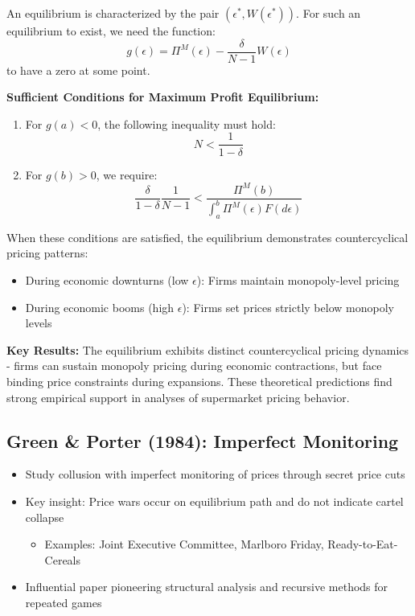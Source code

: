 \documentclass[11pt]{elegantbook_2}
\begin{document}
An equilibrium is characterized by the pair $(\epsilon^*, W(\epsilon^*))$. For such an equilibrium to exist, we need the function:
\[g(\epsilon) = \Pi^M(\epsilon) - \frac{\delta}{N-1}W(\epsilon)\]
to have a zero at some point.

\textbf{Sufficient Conditions for Maximum Profit Equilibrium:}
\begin{enumerate}
    \item For $g(a) < 0$, the following inequality must hold:
    \[N < \frac{1}{1-\delta}\]
    
    \item For $g(b) > 0$, we require:
    \[\frac{\delta}{1-\delta}\frac{1}{N-1} < \frac{\Pi^M(b)}{\int_a^b \Pi^M(\epsilon)F(d\epsilon)}\]
\end{enumerate}

When these conditions are satisfied, the equilibrium demonstrates countercyclical pricing patterns:
\begin{itemize}
    \item During economic downturns (low $\epsilon$): Firms maintain monopoly-level pricing
    \item During economic booms (high $\epsilon$): Firms set prices strictly below monopoly levels
\end{itemize}


\textbf{Key Results:}
The equilibrium exhibits distinct countercyclical pricing dynamics - firms can sustain monopoly pricing during economic contractions, but face binding price constraints during expansions. These theoretical predictions find strong empirical support in analyses of supermarket pricing behavior.

\subsection{Green \& Porter (1984): Imperfect Monitoring}
\begin{itemize}
    \item Study collusion with imperfect monitoring of prices through secret price cuts
    \item Key insight: Price wars occur on equilibrium path and do not indicate cartel collapse
        \begin{itemize}
            \item Examples: Joint Executive Committee, Marlboro Friday, Ready-to-Eat-Cereals
        \end{itemize}
    \item Influential paper pioneering structural analysis and recursive methods for repeated games
\end{itemize}
\end{document}
